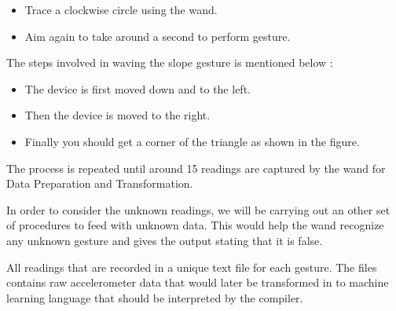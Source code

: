 \begin{itemize}
    \item Trace a clockwise circle using the wand.
    
    \item Aim again to take around a second to perform gesture.
    
\end{itemize}



The steps involved in waving the slope gesture is mentioned below \cite{Warden:2020}:

\begin{center}
\end{center}

\begin{itemize}
    \item The device is first moved down and to the left.
    \item Then the device is moved to the right.
    \item Finally you should get a corner of the triangle as shown in the figure.
\end{itemize}



The process is repeated until around 15 readings are captured by the wand for Data Preparation and Transformation. 

In order to consider the unknown readings, we will be carrying out an other set of procedures to feed with unknown data. This would help the wand recognize any unknown gesture and gives the output stating that it is false. \cite{Warden:2020}




All readings that are recorded in a unique text file for each gesture. The files  contains raw accelerometer data that would later be transformed in to machine learning language that should be interpreted by the compiler. \cite{Warden:2020}







